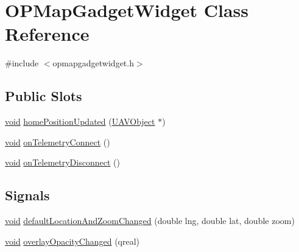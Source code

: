 \hypertarget{class_o_p_map_gadget_widget}{\section{\-O\-P\-Map\-Gadget\-Widget \-Class \-Reference}
\label{class_o_p_map_gadget_widget}
}


{\ttfamily \#include $<$opmapgadgetwidget.\-h$>$}

\subsection*{\-Public \-Slots}
\begin{DoxyCompactItemize}
\item 
\hyperlink{group___u_a_v_objects_plugin_ga444cf2ff3f0ecbe028adce838d373f5c}{void} \hyperlink{group___o_p_map_plugin_gae67526d9495209b93360c1fae84e3d47}{home\-Position\-Updated} (\hyperlink{class_u_a_v_object}{\-U\-A\-V\-Object} $\ast$)
\item 
\hyperlink{group___u_a_v_objects_plugin_ga444cf2ff3f0ecbe028adce838d373f5c}{void} \hyperlink{group___o_p_map_plugin_gad7068b438d89bb8f2a9e31ef5ca2d708}{on\-Telemetry\-Connect} ()
\item 
\hyperlink{group___u_a_v_objects_plugin_ga444cf2ff3f0ecbe028adce838d373f5c}{void} \hyperlink{group___o_p_map_plugin_ga723918dc2ebb03ce17180228e4233d06}{on\-Telemetry\-Disconnect} ()
\end{DoxyCompactItemize}
\subsection*{\-Signals}
\begin{DoxyCompactItemize}
\item 
\hyperlink{group___u_a_v_objects_plugin_ga444cf2ff3f0ecbe028adce838d373f5c}{void} \hyperlink{group___o_p_map_plugin_ga1e2bbe9f774b6c505ba7645a868f1c52}{default\-Location\-And\-Zoom\-Changed} (double lng, double lat, double zoom)
\item 
\hyperlink{group___u_a_v_objects_plugin_ga444cf2ff3f0ecbe028adce838d373f5c}{void} \hyperlink{group___o_p_map_plugin_gaa3099fde3c8867538207ed89067345eb}{overlay\-Opacity\-Changed} (qreal)
\end{DoxyCompactItemize}
